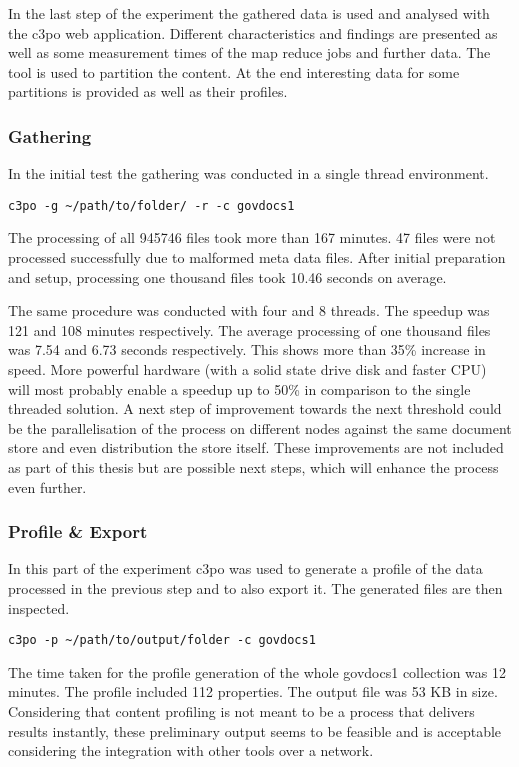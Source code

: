 In the last step of the experiment the gathered data is used and analysed with the c3po web application.
Different characteristics and findings are presented as well as some measurement times of the map reduce jobs and further data.
The tool is used to partition the content.
At the end interesting data for some partitions is provided as well as their profiles.

\subsubsection{Gathering}
In the initial test the gathering was conducted in a single thread environment. 

\begin{verbatim}
c3po -g ~/path/to/folder/ -r -c govdocs1
\end{verbatim}

The processing of all 945746 files took more than 167 minutes.
47 files were not processed successfully due to malformed meta data files.
After initial preparation and setup, processing one thousand files took 10.46 seconds on average.

The same procedure was conducted with four and 8 threads.
The speedup was 121 and 108 minutes respectively.
The average processing of one thousand files was 7.54 and 6.73  seconds respectively.
This shows more than 35\% increase in speed.
More powerful hardware (with a solid state drive disk and faster CPU) will most probably enable a speedup up to 50\% in comparison to the single threaded solution.
A next step of improvement towards the next threshold could be the parallelisation of the process on different nodes against the same document store and even distribution the store itself.
These improvements are not included as part of this thesis but are possible next steps, which will enhance the process even further.

\subsubsection{Profile \& Export}
In this part of the experiment c3po was used to generate a profile of the data processed in the previous step and to also export it.
The generated files are then inspected.

\begin{verbatim}
c3po -p ~/path/to/output/folder -c govdocs1
\end{verbatim}

The time taken for the profile generation of the whole govdocs1 collection was 12 minutes.
The profile included 112 properties. The output file was 53 KB in size.
Considering that content profiling is not meant to be a process that delivers results instantly, these preliminary output seems to be feasible and is acceptable considering the integration with other tools over a network.

